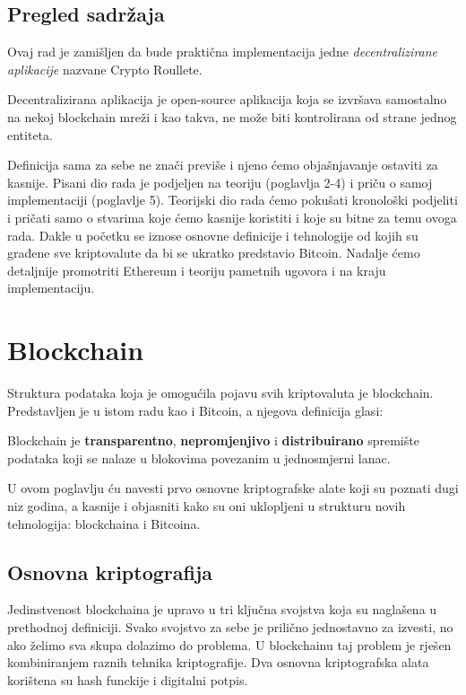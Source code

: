 \documentclass[12pt]{report}
\begin{document}
\section{Pregled sadržaja}

Ovaj rad je zamišljen da bude praktična implementacija jedne \emph{decentralizirane aplikacije} nazvane Crypto Roullete.

\begin{definicija}
\label{def:dapp}
Decentralizirana aplikacija je open-source aplikacija koja se izvršava samostalno na nekoj blockchain mreži i kao takva, ne može biti kontrolirana od strane jednog entiteta. 
\end{definicija}

Definicija sama za sebe ne znači previše i njeno ćemo objašnjavanje ostaviti za kasnije. Pisani dio rada je podjeljen na teoriju (poglavlja 2-4) i priču o samoj implementaciji (poglavlje 5). Teorijski dio rada ćemo pokušati kronološki podjeliti i pričati samo o stvarima koje ćemo kasnije koristiti i koje su bitne za temu ovoga rada. Dakle u početku se iznose osnovne definicije i tehnologije od kojih su građene sve kriptovalute da bi se ukratko predstavio Bitcoin. Nadalje ćemo detaljnije promotriti Ethereum i teoriju pametnih ugovora i na kraju implementaciju. 

\chapter{Blockchain}
Struktura podataka koja je omogućila pojavu svih kriptovaluta je blockchain. Predstavljen je u istom radu kao i Bitcoin\cite{bitcoin}, a njegova definicija glasi:

\begin{definicija}
\label{def:block}
Blockchain je \textbf{transparentno}, \textbf{nepromjenjivo} i \textbf{distribuirano} spremište podataka koji se nalaze u blokovima povezanim u jednosmjerni lanac. 
\end{definicija}

U ovom poglavlju ću navesti prvo osnovne kriptografske alate koji su poznati dugi niz godina, a kasnije i objasniti kako su oni uklopljeni u strukturu novih tehnologija:  blockchaina i Bitcoina.

\section{Osnovna kriptografija}
Jedinstvenost blockchaina je upravo u tri ključna svojstva koja su naglašena u prethodnoj definiciji. Svako svojstvo za sebe je prilično jednostavno za izvesti, no ako želimo sva skupa dolazimo do problema. U blockchainu taj problem je rješen kombiniranjem raznih tehnika kriptografije. Dva osnovna kriptografska alata korištena su hash funckije i digitalni potpis. 
\end{document}

